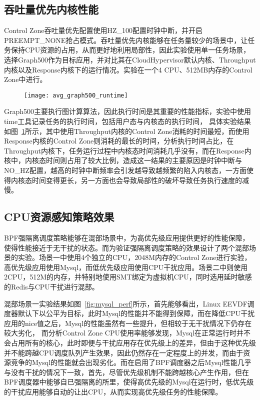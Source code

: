 \subsection{吞吐量优先内核性能}


Control Zone吞吐量优先配置使用HZ\_100配置时钟中断，并开启PREEMPT\_NONE抢占模式。吞吐量优先内核能够在任务量较少的场景中，让任务保持CPU资源的占用，从而更好地利用局部性，因此实验使用单一任务场景，选择Graph500作为目标应用，并对比其在CloudHypervisor默认内核、Throughput内核以及Response内核下的运行情况。实验在一个4 CPU、512MB内存的Control Zone中进行。

\begin{figure}[H]
    \centering
    \texttt{[image: avg\_graph500\_runtime]}
    \label{fig:avg_graph500_runtime}
\end{figure}

Graph500主要执行图计算算法，因此执行时间是其重要的性能指标，实验中使用time工具记录任务的执行时间，包括用户态与内核态的执行时间， 具体实验结果如图~\ref{fig:avg_graph500_runtime}所示，其中使用Throughput内核的Control Zone消耗的时间最短，而使用Response内核的Control Zone则消耗的最长的时间，分析执行时间占比，在Throughput内核下，任务运行过程中内核态时间消耗几乎没有，而在Response内核中，内核态时间则占用了较大比例，造成这一结果的主要原因是时钟中断与NO\_HZ配置，越高的时钟中断频率会引发越导致越频繁的陷入内核态，一方面使得内核态时间变得更长，另一方面也会导致局部性的破坏导致任务执行速度的减慢。

\subsection{CPU资源感知策略效果}


BPF强隔离调度策略能够在混部场景中，为高优先级应用提供更好的性能保障，使得性能接近于无干扰的状态。而为验证强隔离调度策略的效果设计了两个混部场景的实验。场景一中使用4个独立的CPU，2048M内存的Control Zone进行实验，高优先级应用使用Mysql，而低优先级应用使用CPU干扰应用。场景二中则使用2CPU，512M的内存，并特别地使用SMT绑定为虚拟机CPU，同时选用延时敏感的Redis与CPU干扰进行混部。

混部场景一实验结果如图~\ref{fig:mysql_perf}所示，首先能够看出，Linux EEVDF调度器默认下以公平为目标，此时Mysql的性能并不能得到保障，而在降低CPU干扰应用的nice值之后，Mysql的性能虽然有一些提升，但相较于无干扰情况下仍存在较大劣化， 而分析Control Zone CPU使用率能够发现，Mysql在正常运行时并不会占用所有的核心，此时即便与干扰应用存在优先级上的差异，但由于这种优先级并不能跨越CPU调度队列产生效果，因此仍然存在一定程度上的并发，而由于资源竞争的Mysql的性能就会出现劣化。而在启用了BPF调度器之后Mysql性能几乎与没有干扰的情况下一致，首先，尽管优先级机制不能跨越核心产生作用，但在BPF调度器中能够自已强隔离的所里，使得高优先级的Mysql在运行时，低优先级的干扰应用能够自动的让出CPU，从而实现高优先级任务的性能保障。

